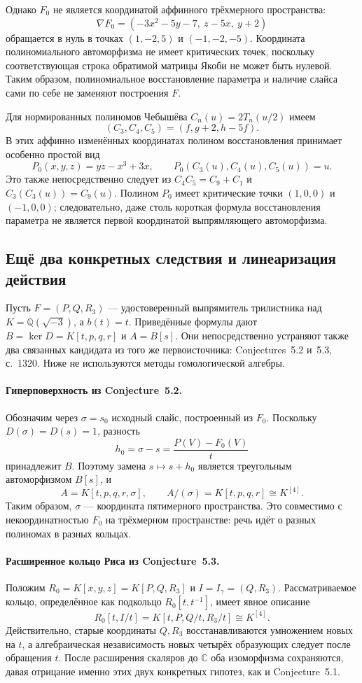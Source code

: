 Однако $F_0$ не является координатой аффинного трёхмерного пространства:
\[
 \nabla F_0=(-3x^2-5y-7,\ z-5x,\ y+2)
\]
обращается в нуль в точках $(1,-2,5)$ и $(-1,-2,-5)$.
Координата полиномиального автоморфизма не имеет критических точек,
поскольку соответствующая строка обратимой матрицы Якоби не может
быть нулевой. Таким образом, полиномиальное восстановление параметра
и наличие слайса сами по себе не заменяют построения $F$.

Для нормированных полиномов Чебышёва $C_n(u)=2T_n(u/2)$ имеем
\[
 (C_3,C_4,C_5)=(f,g+2,h-5f).
\]
В этих аффинно изменённых координатах полином восстановления принимает
особенно простой вид
\[
 P_0(x,y,z)=yz-x^3+3x,\qquad P_0(C_3(u),C_4(u),C_5(u))=u.
\]
Это также непосредственно следует из
$C_4C_5=C_9+C_1$ и $C_3(C_3(u))=C_9(u)$.
Полином $P_0$ имеет критические точки $(1,0,0)$ и $(-1,0,0)$;
следовательно, даже столь короткая формула восстановления параметра
не является первой координатой выпрямляющего автоморфизма.

\subsection{Ещё два конкретных следствия и линеаризация действия}

Пусть $F=(P,Q,R_3)$ --- удостоверенный выпрямитель трилистника над
$K=\mathbb Q(\sqrt{-3})$, а $b(t)=t$. Приведённые формулы дают
$B=\ker D=K[t,p,q,r]$ и $A=B[s]$. Они непосредственно устраняют также
два связанных кандидата из того же первоисточника: Conjectures~5.2 и~5.3,
с.~1320. Ниже не используются методы гомологической алгебры.

\paragraph{Гиперповерхность из Conjecture~5.2.}
Обозначим через $\sigma=s_0$ исходный слайс, построенный из $F_0$.
Поскольку $D(\sigma)=D(s)=1$, разность
\[
 h_0=\sigma-s=\frac{P(V)-F_0(V)}t
\]
принадлежит $B$. Поэтому замена $s\mapsto s+h_0$ является
треугольным автоморфизмом $B[s]$, и
\[
 A=K[t,p,q,r,\sigma],\qquad A/(\sigma)=K[t,p,q,r]\cong K^{[4]}.
\]
Таким образом, $\sigma$ --- координата пятимерного пространства.
Это совместимо с некоординатностью $F_0$ на трёхмерном пространстве:
речь идёт о разных полиномах в разных кольцах.

\paragraph{Расширенное кольцо Риса из Conjecture~5.3.}
Положим $R_0=K[x,y,z]=K[P,Q,R_3]$ и $I=I_\gamma=(Q,R_3)$.
Рассматриваемое кольцо, определённое как подкольцо $R_0[t,t^{-1}]$,
имеет явное описание
\[
 R_0[t,I/t]=K[t,P,Q/t,R_3/t]\cong K^{[4]}.
\]
Действительно, старые координаты $Q,R_3$ восстанавливаются умножением
новых на $t$, а алгебраическая независимость новых четырёх образующих
следует после обращения $t$. После расширения скаляров до $\mathbb C$
оба изоморфизма сохраняются, давая отрицание именно этих двух
конкретных гипотез, как и Conjecture~5.1.

